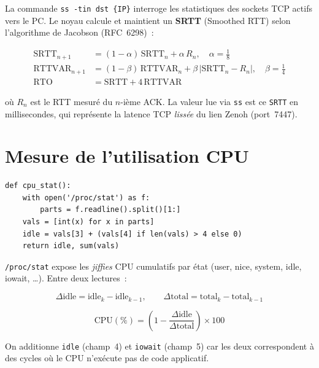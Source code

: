 \documentclass[a4paper,12pt]{article}
\begin{document}
La commande \texttt{ss -tin dst \{IP\}} interroge les statistiques des sockets TCP
actifs vers le PC. Le noyau calcule et maintient un \textbf{SRTT} (Smoothed RTT) selon
l'algorithme de Jacobson (RFC~6298)~:

\begin{align}
  \text{SRTT}_{n+1} &= (1-\alpha)\,\text{SRTT}_n + \alpha\,R_n, \quad \alpha = \tfrac{1}{8} \\
  \text{RTTVAR}_{n+1} &= (1-\beta)\,\text{RTTVAR}_n + \beta\,|\text{SRTT}_n - R_n|, \quad \beta = \tfrac{1}{4} \\
  \text{RTO} &= \text{SRTT} + 4\,\text{RTTVAR}
\end{align}

où $R_n$ est le RTT mesuré du $n$-ième ACK. La valeur lue via \texttt{ss} est ce
\texttt{SRTT} en millisecondes, qui représente la latence TCP \emph{lissée} du lien Zenoh
(port~7447).

\section{Mesure de l'utilisation CPU}

\begin{lstlisting}[caption={Lecture de /proc/stat}]
def cpu_stat():
    with open('/proc/stat') as f:
        parts = f.readline().split()[1:]
    vals = [int(x) for x in parts]
    idle = vals[3] + (vals[4] if len(vals) > 4 else 0)
    return idle, sum(vals)
\end{lstlisting}

\texttt{/proc/stat} expose les \emph{jiffies} CPU cumulatifs par état (user, nice, system,
idle, iowait, \ldots). Entre deux lectures~:

\begin{equation}
  \Delta\text{idle} = \text{idle}_k - \text{idle}_{k-1}, \qquad
  \Delta\text{total} = \text{total}_k - \text{total}_{k-1}
\end{equation}

\begin{equation}
  \boxed{\text{CPU}(\%) = \left(1 - \frac{\Delta\text{idle}}{\Delta\text{total}}\right) \times 100}
\end{equation}

On additionne \texttt{idle} (champ~4) et \texttt{iowait} (champ~5) car les deux
correspondent à des cycles où le CPU n'exécute pas de code applicatif.
\end{document}
